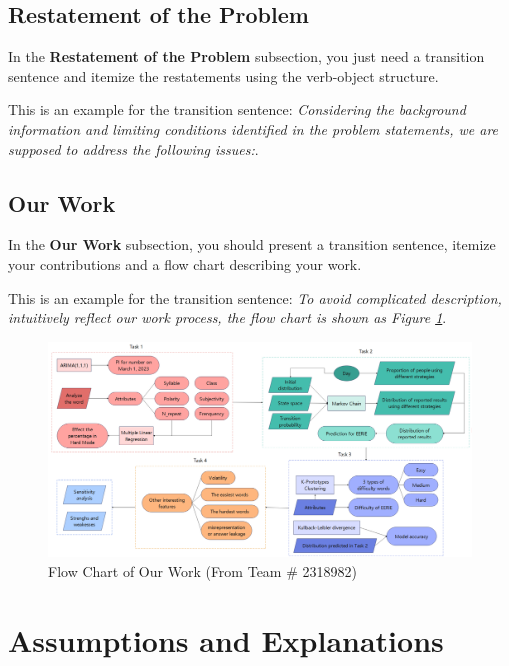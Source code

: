\documentclass[12pt]{article}  %
\begin{document}
 
 \subsection{Restatement of the Problem}
 
 In the \textbf{Restatement of the Problem} subsection, you just need a transition sentence and itemize the restatements using the 
 verb-object structure. 
 
 This is an example for the transition sentence: \textit{Considering the background information and limiting conditions identified in the problem statements, we are supposed to address the following issues:}. 
 
 \subsection{Our Work}
 
 In the \textbf{Our Work} subsection, you should present a transition sentence, itemize your contributions and a flow chart describing your work. 
 
 This is an example for the transition sentence:  \textit{To avoid complicated description, intuitively reflect our work process, the flow chart is shown as Figure \ref{fig1}}.
  
 
 
 \begin{figure}[htbp]  %
 
 \centering  %
 \includegraphics[width=.9\textwidth]{Flow_Chart.png} %
 \caption{Flow Chart of Our Work (From Team \# 2318982)} %
 \label{fig1}%
 \end{figure}
 
 
 \section{Assumptions and Explanations}
 
\end{document}
